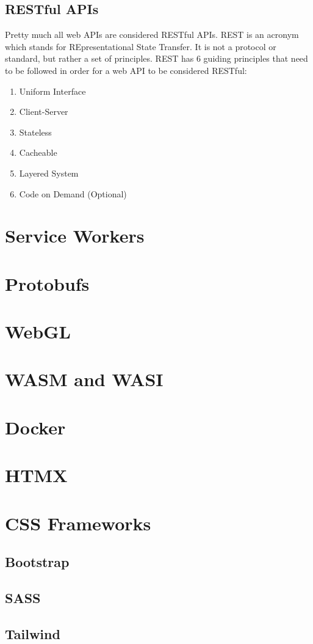\documentclass{article}
\begin{document}
\subsection{RESTful APIs}

Pretty much all web APIs are considered RESTful APIs. REST is an acronym which stands for REpresentational
State Transfer. It is not a protocol or standard, but rather a set of principles. REST has 6 guiding principles
that need to be followed in order for a web API to be considered RESTful:

\begin{enumerate}

\item Uniform Interface

\item Client-Server

\item Stateless

\item Cacheable

\item Layered System

\item Code on Demand (Optional)

\end{enumerate}

\section{Service Workers}

\section{Protobufs}

\section{WebGL}

\section{WASM and WASI}

\section{Docker}

\section{HTMX}

\section{CSS Frameworks}

\subsection{Bootstrap}

\subsection{SASS}

\subsection{Tailwind}
\end{document}
